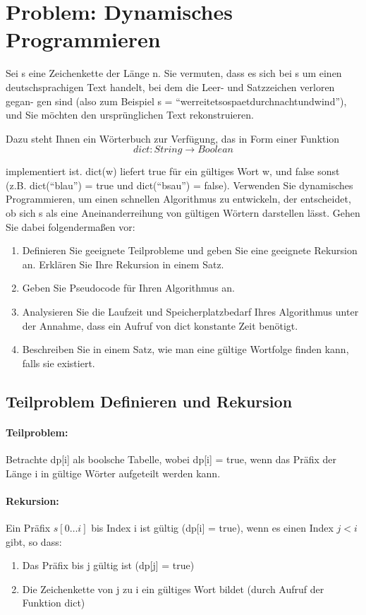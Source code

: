 \section{Problem: Dynamisches Programmieren}

Sei s eine Zeichenkette der Länge n. Sie vermuten, dass es sich bei s um einen
deutschsprachigen Text handelt, bei dem die Leer- und Satzzeichen verloren gegan-
gen sind (also zum Beispiel s = “werreitetsospaetdurchnachtundwind”), und Sie
möchten den ursprünglichen Text rekonstruieren.

\vspace{1em}

\noindent
Dazu steht Ihnen ein Wörterbuch zur Verfügung, das in Form einer Funktion
$$dict : String \rightarrow Boolean$$

\noindent
implementiert ist. dict(w) liefert true für ein gültiges Wort w, und false sonst
(z.B. dict(“blau”) = true und dict(“bsau”) = false).
Verwenden Sie dynamisches Programmieren, um einen schnellen Algorithmus zu
entwickeln, der entscheidet, ob sich s als eine Aneinanderreihung von gültigen
Wörtern darstellen lässt. Gehen Sie dabei folgendermaßen vor:

\begin{enumerate}
	\item Definieren Sie geeignete Teilprobleme und geben Sie eine geeignete Rekursion an. Erklären Sie Ihre Rekursion in einem Satz.
	\item Geben Sie Pseudocode für Ihren Algorithmus an.
	\item Analysieren Sie die Laufzeit und Speicherplatzbedarf Ihres Algorithmus unter der Annahme, dass ein Aufruf von dict konstante Zeit benötigt.
	\item Beschreiben Sie in einem Satz, wie man eine gültige Wortfolge finden kann,
	falls sie existiert.
\end{enumerate}

\subsection{Teilproblem Definieren und Rekursion}

\paragraph{Teilproblem:} Betrachte dp[i] als boolsche Tabelle, wobei dp[i] = true, wenn das Präfix der Länge i in gültige Wörter aufgeteilt werden kann.  

\paragraph{Rekursion:} Ein Präfix $s[0 \dots i]$ bis Index i ist gültig (dp[i] = true), wenn es einen Index $j<i$ gibt, so dass: 
\begin{enumerate}
	\item Das Präfix bis j gültig ist (dp[j] = true)
	\item Die Zeichenkette von j zu i ein gültiges Wort bildet (durch Aufruf der Funktion dict)
\end{enumerate} 


